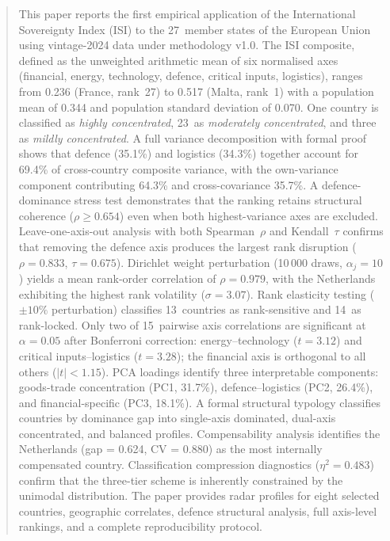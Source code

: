 \documentclass[12pt,a4paper]{article}
\begin{document}
\hypersetup{pageanchor=false}


\begin{abstract}
\noindent
This paper reports the first empirical application of the International
Sovereignty Index (ISI) to the 27~member states of the European Union
using vintage-2024 data under methodology v1.0.  The ISI composite,
defined as the unweighted arithmetic mean of six normalised axes
(financial, energy, technology, defence, critical inputs, logistics),
ranges from 0.236 (France, rank~27) to 0.517
(Malta, rank~1) with a population mean of 0.344 and
population standard deviation of 0.070.  One country is
classified as \emph{highly concentrated}, 23~as \emph{moderately
concentrated}, and three as \emph{mildly concentrated}.
A full variance decomposition with formal proof shows that defence
(35.1\%) and logistics (34.3\%) together account for 69.4\% of
cross-country composite variance, with the own-variance component
contributing 64.3\% and cross-covariance 35.7\%.  A defence-dominance
stress test demonstrates that the ranking retains structural coherence
($\rho \geq 0.654$) even when both highest-variance axes are excluded.
Leave-one-axis-out
analysis with both Spearman~$\rho$ and Kendall~$\tau$ confirms that
removing the defence axis produces the largest rank disruption
($\rho = 0.833$, $\tau = 0.675$).  Dirichlet weight perturbation
(10\,000 draws, $\alpha_j=10$) yields a mean rank-order correlation
of $\rho = 0.979$, with the Netherlands exhibiting the highest rank
volatility ($\sigma = 3.07$).  Rank elasticity testing ($\pm 10\%$
perturbation) classifies 13~countries as rank-sensitive and 14~as
rank-locked.  Only two of 15~pairwise axis correlations are
significant at $\alpha = 0.05$ after Bonferroni correction:
energy--technology ($t = 3.12$)
and critical inputs--logistics ($t = 3.28$); the financial axis is
orthogonal to all others ($|t| < 1.15$).  PCA loadings identify
three interpretable components: goods-trade concentration (PC1,
31.7\%), defence--logistics (PC2, 26.4\%), and financial-specific
(PC3, 18.1\%).  A formal structural typology classifies countries
by dominance gap into single-axis dominated, dual-axis concentrated,
and balanced profiles.  Compensability analysis
identifies the Netherlands (gap = 0.624, CV = 0.880) as the most
internally compensated country.  Classification compression
diagnostics ($\eta^2 = 0.483$) confirm that the three-tier scheme
is inherently constrained by the unimodal distribution.  The paper
provides radar profiles for eight selected countries, geographic
correlates, defence structural analysis, full axis-level rankings,
and a complete reproducibility protocol.
\end{abstract}
\end{document}

